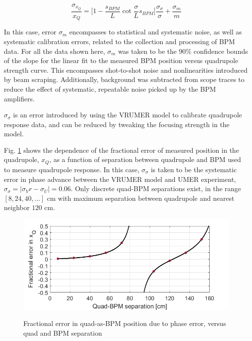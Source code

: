\begin{equation} \frac{\sigma_{x_Q}}{x_Q} = \bigg[1-\frac{s_{BPM}}{L}\cot{\frac{\sigma}{L}s_{BPM}} \bigg]\frac{\sigma_\sigma}{\sigma} + \frac{\sigma_m}{m} 
\label{eq:quad-as-bpm-error}
\end{equation}

In this case, error $\sigma_m$ encompasses to statistical and systematic noise, as well as systematic calibration errors, related to the collection and processing of BPM data. For all the data shown here, $\sigma_m$ was taken to be the $90\%$ confidence bounds of the slope for the linear fit to the measured BPM position versus quadrupole strength curve. This encompasses shot-to-shot noise and nonlinearities introduced by beam scraping. Additionally, background was subtracted from scope traces to reduce the effect of systematic, repeatable noise picked up by the BPM amplifiers. 

$\sigma_\sigma$ is an error introduced by using the VRUMER model to calibrate quadrupole response data, and can be reduced by tweaking the focusing strength in the model. 

Fig. \ref{fig:quad-as-bpm-error} shows the dependence of the fractional error of measured position in the quadrupole, $x_Q$, as a function of separation between quadrupole and BPM used to measure quadrupole response. In this case, $\sigma_\sigma$ is taken to be the systematic error in phase advance between the VRUMER model and UMER experiment, $\sigma_\sigma = \mid \sigma_Vr - \sigma_U \mid = 0.06$. Only discrete quad-BPM separations exist, in the range $[8,24,40,...]$ cm with maximum separation between quadrupole and nearest neighbor $120$ cm. 


\begin{figure}
\begin{center}
\includegraphics[width=\textwidth]{4.figures/quad_as_BPM_error.png}
\end{center}
\renewcommand{\baselinestretch}{1}
\small\normalsize
\begin{quote}
\caption[]{Fractional error in quad-as-BPM position due to phase error, versus quad and BPM separation}
\label{fig:quad-as-bpm-error}
\end{quote}
\end{figure} 
\renewcommand{\baselinestretch}{2}
\small\normalsize



